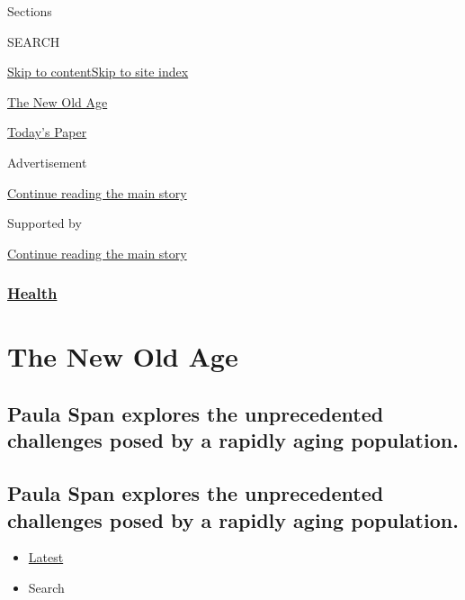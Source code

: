 Sections

SEARCH

\protect\hyperlink{site-content}{Skip to
content}\protect\hyperlink{site-index}{Skip to site index}

\href{https://www.nytimes.com/column/the-new-old-age}{The New Old Age}

\href{https://myaccount.nytimes.com/auth/login?response_type=cookie\&client_id=vi}{}

\href{https://www.nytimes.com/section/todayspaper}{Today's Paper}

Advertisement

\protect\hyperlink{after-top}{Continue reading the main story}

Supported by

\protect\hyperlink{after-sponsor}{Continue reading the main story}

\hypertarget{health}{%
\subsubsection{\texorpdfstring{\href{/section/health}{Health}}{Health}}\label{health}}

\hypertarget{the-new-old-age}{%
\section{The New Old Age}\label{the-new-old-age}}

\hypertarget{paula-span-explores-the-unprecedented-challenges-posed-by-a-rapidly-aging-population}{%
\subsection{Paula Span explores the unprecedented challenges posed by a
rapidly aging
population.}\label{paula-span-explores-the-unprecedented-challenges-posed-by-a-rapidly-aging-population}}

\hypertarget{paula-span-explores-the-unprecedented-challenges-posed-by-a-rapidly-aging-population-1}{%
\subsection{Paula Span explores the unprecedented challenges posed by a
rapidly aging
population.}\label{paula-span-explores-the-unprecedented-challenges-posed-by-a-rapidly-aging-population-1}}

\begin{itemize}
\tightlist
\item
  \protect\hyperlink{stream-panel}{Latest}
\item
  Search
\end{itemize}

